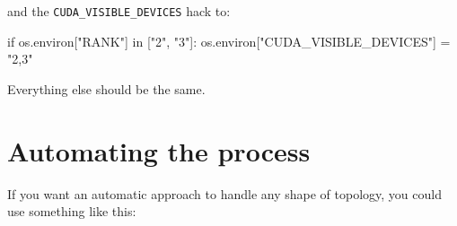 \documentclass[
]{report}
\newenvironment{Shaded}{\begin{snugshade}}{\end{snugshade}}
\newcommand{\ControlFlowTok}[1]{\textcolor[rgb]{0.00,0.23,0.31}{#1}}
\newcommand{\ExtensionTok}[1]{\textcolor[rgb]{0.00,0.23,0.31}{#1}}
\newcommand{\NormalTok}[1]{\textcolor[rgb]{0.00,0.23,0.31}{#1}}
\newcommand{\StringTok}[1]{\textcolor[rgb]{0.13,0.47,0.30}{#1}}
\begin{document}
\begin{Shaded}
\end{Shaded}

and the \texttt{CUDA\_VISIBLE\_DEVICES} hack to:

\begin{Shaded}
\begin{Highlighting}[]
\ControlFlowTok{if} \ExtensionTok{os.environ[}\StringTok{"RANK"}\ExtensionTok{]}\NormalTok{ in [}\StringTok{"2"}\NormalTok{, }\StringTok{"3"}\NormalTok{]:}
    \ExtensionTok{os.environ[}\StringTok{"CUDA\_VISIBLE\_DEVICES"}\ExtensionTok{]}\NormalTok{ = }\StringTok{"2,3"}
\end{Highlighting}
\end{Shaded}

Everything else should be the same.

\section{Automating the process}\label{automating-the-process}

If you want an automatic approach to handle any shape of topology, you
could use something like this:
\end{document}
